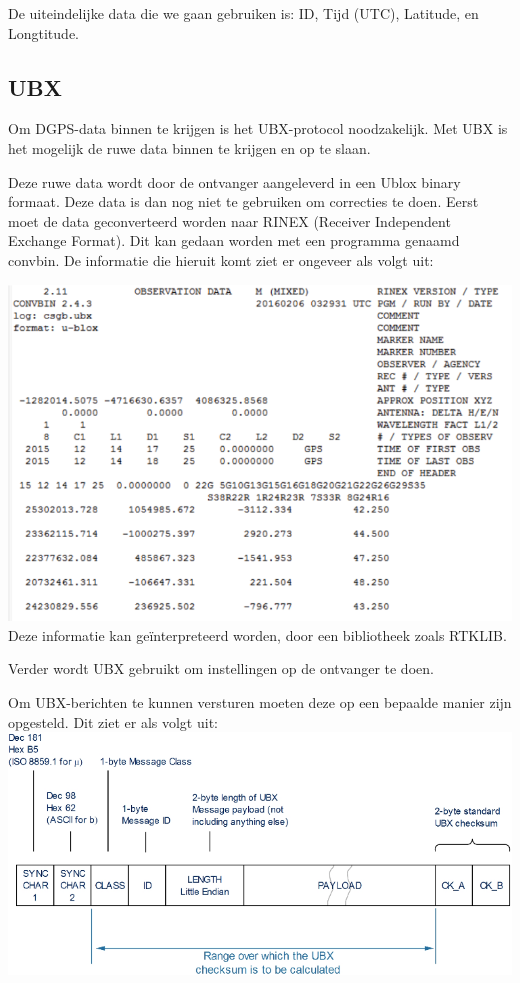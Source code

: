 De uiteindelijke data die we gaan gebruiken is:
ID, Tijd (UTC), Latitude, en Longtitude.

\newpage
\subsection{UBX}
Om DGPS-data binnen te krijgen is het UBX-protocol noodzakelijk. Met UBX is het
mogelijk de ruwe data binnen te krijgen en op te slaan.

Deze ruwe data wordt door de ontvanger aangeleverd in een Ublox binary formaat.
Deze data is dan nog niet te gebruiken om correcties te doen. Eerst moet de data
geconverteerd worden naar RINEX (Receiver Independent Exchange Format). Dit kan
gedaan worden met een programma genaamd convbin.
De informatie die hieruit komt ziet er ongeveer als volgt uit:

\includegraphics[width=\textwidth]{technical/obsfile}
\citep{rtklibexplorer}\\

Deze informatie kan geïnterpreteerd worden, door een bibliotheek zoals RTKLIB.

Verder wordt UBX gebruikt om instellingen op de ontvanger te doen.

Om UBX-berichten te kunnen versturen moeten deze op een bepaalde manier zijn
opgesteld. Dit ziet er als volgt uit:\\
\includegraphics[width=\textwidth]{technical/ubx}
\citep[p. 132]{UBlox8}\\

